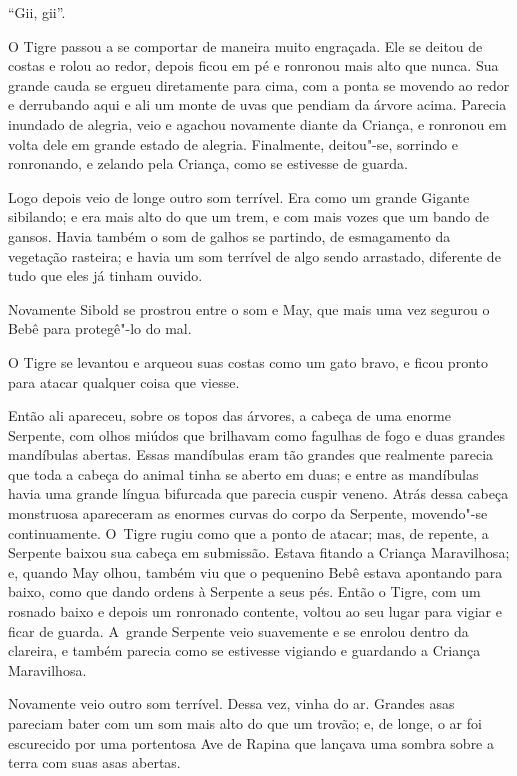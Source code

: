 ``Gii, gii''.

O Tigre passou a se comportar de maneira muito engraçada. Ele se deitou
de costas e rolou ao redor, depois ficou em pé e ronronou mais alto que
nunca. Sua grande cauda se ergueu diretamente para cima, com a ponta se
movendo ao redor e derrubando aqui e ali um monte de uvas que pendiam da
árvore acima. Parecia inundado de alegria, veio e agachou novamente
diante da Criança, e ronronou em volta dele em grande estado de alegria.
Finalmente, deitou"-se, sorrindo e ronronando, e zelando pela Criança,
como se estivesse de guarda.

Logo depois veio de longe outro som terrível. Era como um grande Gigante
sibilando; e era mais alto do que um trem, e com mais vozes que um bando
de gansos. Havia também o som de galhos se partindo, de esmagamento da
vegetação rasteira; e havia um som terrível de algo sendo arrastado,
diferente de tudo que eles já tinham ouvido.

Novamente Sibold se prostrou entre o som e May, que mais uma vez segurou
o Bebê para protegê"-lo do mal.

O Tigre se levantou e arqueou suas costas como um gato bravo, e ficou
pronto para atacar qualquer coisa que viesse.

Então ali apareceu, sobre os topos das árvores, a cabeça de uma enorme
Serpente, com olhos miúdos que brilhavam como fagulhas de fogo e duas
grandes mandíbulas abertas. Essas mandíbulas eram tão grandes que
realmente parecia que toda a cabeça do animal tinha se aberto em duas; e
entre as mandíbulas havia uma grande língua bifurcada que parecia cuspir
veneno. Atrás dessa cabeça monstruosa apareceram as enormes curvas do
corpo da Serpente, movendo"-se continuamente. O~Tigre rugiu como que a
ponto de atacar; mas, de repente, a Serpente baixou sua cabeça em
submissão. Estava fitando a Criança Maravilhosa; e, quando May olhou,
também viu que o pequenino Bebê estava apontando para baixo, como que
dando ordens à Serpente a seus pés. Então o Tigre, com um rosnado baixo
e depois um ronronado contente, voltou ao seu lugar para vigiar e ficar
de guarda. A~grande Serpente veio suavemente e se enrolou dentro da
clareira, e também parecia como se estivesse vigiando e guardando a
Criança Maravilhosa.

Novamente veio outro som terrível. Dessa vez, vinha do ar. Grandes asas
pareciam bater com um som mais alto do que um trovão; e, de longe, o ar
foi escurecido por uma portentosa Ave de Rapina que lançava uma sombra
sobre a terra com suas asas abertas.

